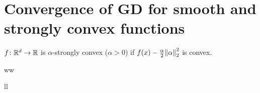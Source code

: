 \section{Convergence of GD for smooth and strongly convex functions}

\begin{definition}
    \(f \colon \mathbb{R}^d \to \mathbb{R}\) is \(\alpha\)-strongly convex (\(\alpha > 0\)) if 
    \(f(x) - \frac{\alpha}{2} \norm{\alpha}_2^2\) is convex. 
\end{definition}

\begin{lemma}
    ww  
\end{lemma}

ll
